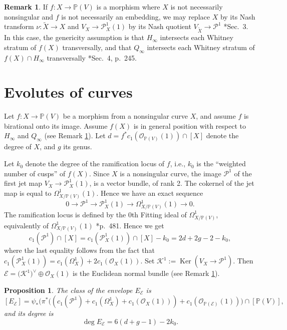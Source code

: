 \documentclass[reqno]{amsart}
\newtheorem{prop}[lemma]{Proposition}
\theoremstyle{definition}
\newtheorem{remark}[lemma]{Remark}
\theoremstyle{remark}
\DeclareMathOperator{\Ker}{Ker}
\begin{document}
\begin{remark}\label{Nash}
If $f:X\to \mathbb P(V)$ is a morphism where $X$ is not necessarily nonsingular and $f$ is not necessarily an embedding, we may replace $X$ by its Nash transform $\nu:\widetilde X\to X$ and $V_X\to \mathcal P^1_X(1)$ by its Nash quotient $V_{\widetilde X}\to \mathcal P^1$ \cite{reci}*{Sec.~3}.
In this case, the genericity assumption is that $H_\infty$ intersects each Whitney stratum of $f(X)$ transversally, and that $Q_\infty$ intersects each Whitney stratum of $f(X)\cap H_\infty$ transversally \cite{reci}*{Sec.~4, p.~245}.
\end{remark}

\section{Evolutes of curves}\label{polarcurves}
Let $f: X\to \mathbb P(V)$ be a morphism from a nonsingular curve $X$, and assume $f$ is birational onto its image. Assume $f(X)$ is in general position with respect to $H_\infty$ and $Q_\infty$ (see Remark \ref{Nash}).
Let $d=f^*c_1(\mathcal O_{\mathbb P(V)}(1))\cap [X]$ denote the degree of $X$, and $g$ its genus.

 Let $k_0$ denote the degree of the ramification locus of $f$, i.e., $k_0$ is the ``weighted number of cusps'' of $f(X)$. Since $X$ is a nonsingular curve, the image  $\mathcal P^1$ of the first jet map $V_X\to \mathcal P^1_X(1)$, is a vector bundle, of rank 2. The cokernel of the jet map is equal to $\Omega^1_{X/\mathbb P(V)}(1)$. Hence we have an exact sequence 
 \[0\to \mathcal P^1\to \mathcal P^1_X(1)\to \Omega^1_{X/\mathbb P(V)}(1) \to 0.\]
 The ramification locus is defined by the 0th Fitting ideal of $\Omega^1_{X/\mathbb P(V)}$, equivalently of 
 $\Omega^1_{X/\mathbb P(V)}(1)$ \cite{numchar}*{p.~481}. Hence we get  
 \[c_1(\mathcal P^1)\cap [X] =c_1(\mathcal P^1_X(1))\cap [X]-k_0=2d+2g-2-k_0,\]
 where the last equality follows from the fact that $c_1(\mathcal P^1_X(1))=
 c_1(\Omega^1_X)+2c_1(\mathcal O_X(1))$.
 Set $\mathcal K^1:=\Ker(V_X \to \mathcal P^1)$. Then $\mathcal E=\mathcal (\mathcal K^1)^\vee \oplus \mathcal O_X(1)$  is the Euclidean normal bundle (see Remark \ref{Nash}).
 

\begin{prop}\label{poldev}
The class of the envelope $E_\mathcal E$ is 
\[[E_\mathcal E]=\psi_*\bigl(\pi^*(( c_1(\mathcal P^1)+c_1(\Omega_X^1) +c_1(\mathcal O_X(1))) + c_1(\mathcal O_{\mathbb P(\mathcal E)}(1))\bigr )\cap [\mathbb P(V)],\]
and its degree is
\[\deg E_\mathcal E=6(d+g-1)-2k_0.
\]
\end{prop}
\end{document}
